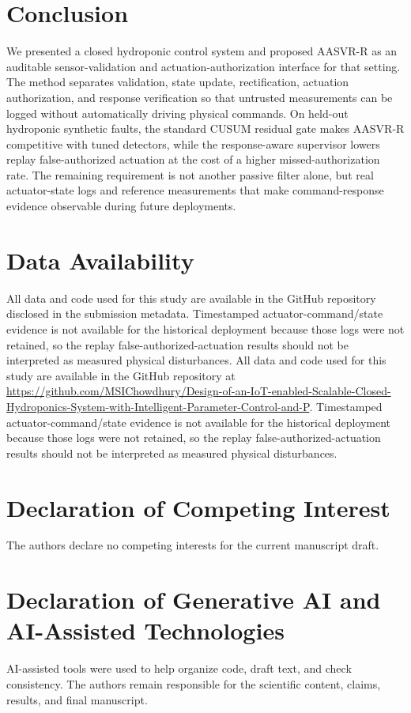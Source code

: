 \documentclass[preprint,12pt,doubleblind]{elsarticle}
\begin{document}
\section{Conclusion}
We presented a closed hydroponic control system and proposed AASVR-R as an auditable sensor-validation and actuation-authorization interface for that setting. The method separates validation, state update, rectification, actuation authorization, and response verification so that untrusted measurements can be logged without automatically driving physical commands. On held-out hydroponic synthetic faults, the standard CUSUM residual gate makes AASVR-R competitive with tuned detectors, while the response-aware supervisor lowers replay false-authorized actuation at the cost of a higher missed-authorization rate. The remaining requirement is not another passive filter alone, but real actuator-state logs and reference measurements that make command-response evidence observable during future deployments.

\section*{Data Availability}
\ifdefined\AASVRBLINDED
All data and code used for this study are available in the GitHub repository disclosed in the submission metadata. Timestamped actuator-command/state evidence is not available for the historical deployment because those logs were not retained, so the replay false-authorized-actuation results should not be interpreted as measured physical disturbances.
\else
All data and code used for this study are available in the GitHub repository at \url{https://github.com/MSIChowdhury/Design-of-an-IoT-enabled-Scalable-Closed-Hydroponics-System-with-Intelligent-Parameter-Control-and-P}. Timestamped actuator-command/state evidence is not available for the historical deployment because those logs were not retained, so the replay false-authorized-actuation results should not be interpreted as measured physical disturbances.
\fi

\section*{Declaration of Competing Interest}
The authors declare no competing interests for the current manuscript draft.

\section*{Declaration of Generative AI and AI-Assisted Technologies}
AI-assisted tools were used to help organize code, draft text, and check consistency. The authors remain responsible for the scientific content, claims, results, and final manuscript.
\FloatBarrier



\end{document}
